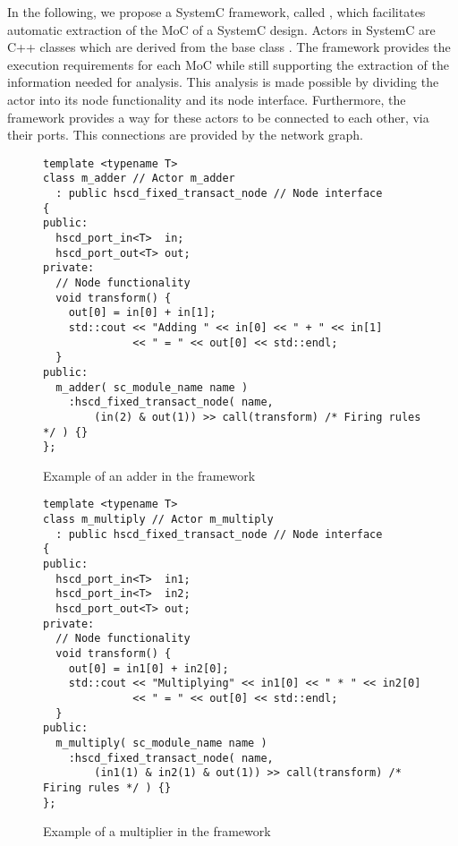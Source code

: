 In the following, we propose a SystemC framework, called \SysteMoC, which
facilitates automatic extraction of the MoC of a SystemC design.
Actors in SystemC are C++ classes which are derived from the base class .
The \SysteMoC{} framework provides the execution requirements for each MoC while
still supporting the extraction of the information needed for analysis.
This analysis is made possible by dividing the actor into its
node functionality and its node interface.
Furthermore, the \SysteMoC{} framework provides a way for these
actors to be connected to each other, via their ports. This connections
are provided by the network graph.

\begin{figure}
\centering
\begin{verbatim}
template <typename T>
class m_adder // Actor m_adder
  : public hscd_fixed_transact_node // Node interface
{
public:
  hscd_port_in<T>  in;
  hscd_port_out<T> out;
private:
  // Node functionality
  void transform() {
    out[0] = in[0] + in[1];
    std::cout << "Adding " << in[0] << " + " << in[1]
              << " = " << out[0] << std::endl;
  }
public:
  m_adder( sc_module_name name )
    :hscd_fixed_transact_node( name,
        (in(2) & out(1)) >> call(transform) /* Firing rules */ ) {}
};
\end{verbatim}
\caption{\label{example-adder-actor}Example of an adder in the \SysteMoC{} framework}
\end{figure}

\begin{figure}
\centering
\begin{verbatim}
template <typename T>
class m_multiply // Actor m_multiply
  : public hscd_fixed_transact_node // Node interface
{
public:
  hscd_port_in<T>  in1;
  hscd_port_in<T>  in2;
  hscd_port_out<T> out;
private:
  // Node functionality
  void transform() {
    out[0] = in1[0] + in2[0];
    std::cout << "Multiplying" << in1[0] << " * " << in2[0]
              << " = " << out[0] << std::endl;
  }
public:
  m_multiply( sc_module_name name )
    :hscd_fixed_transact_node( name,
        (in1(1) & in2(1) & out(1)) >> call(transform) /* Firing rules */ ) {}
};
\end{verbatim}
\caption{\label{example-multiply-actor}Example of a multiplier in the \SysteMoC{} framework}
\end{figure}

